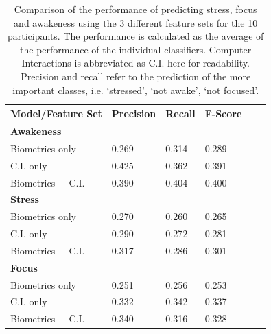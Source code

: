 \begin{table}
\begin{center}
\begin{tabular}{llllll}
\hline
Model/Feature Set & Precision & Recall & F-Score \\ %
\hline
\textbf{Awakeness}\\
\hspace{3mm}Biometrics only  & 0.269 & 0.314 & 0.289 \\ %
\hspace{3mm}C.I. only  & 0.425 & 0.362 & 0.391 \\ %
\hspace{3mm}Biometrics + C.I. & 0.390 & 0.404 & 0.400 \\ %
\hline
\textbf{Stress}\\
\hspace{3mm}Biometrics only  & 0.270 &	0.260 & 0.265 \\ %
\hspace{3mm}C.I. only & 0.290 & 0.272 & 0.281 \\ %
\hspace{3mm}Biometrics + C.I. & 0.317 & 0.286 & 0.301 \\ %
\hline
\textbf{Focus}\\
\hspace{3mm}Biometrics only & 0.251 & 0.256 & 0.253 \\ %
\hspace{3mm}C.I. only & 0.332 & 0.342 & 0.337 \\ %
\hspace{3mm}Biometrics + C.I. & 0.340 & 0.316 & 0.328 \\ %
\hline
\end{tabular}
\caption{Comparison of the performance of predicting stress, focus and awakeness using the 3 different feature sets for the 10 participants. The performance is calculated as the average of the performance of the individual classifiers. Computer Interactions is abbreviated as C.I. here for readability. Precision and recall refer to the prediction of the more important classes, i.e. `stressed', `not awake', `not focused'.}
\label{ciPerformance}
\end{center}
\vspace*{-3mm}
\end{table}

